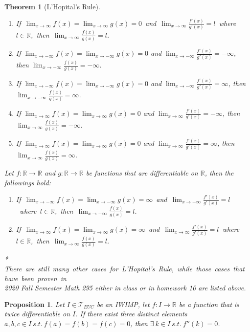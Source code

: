 \documentclass[11pt]{article}
\theoremstyle{break}
\theoremstyle{break}
\newtheorem{thm}{Theorem}[section]
\newtheorem{prop}[lem]{Proposition}
\newcommand{\R}{\mathbb{R}}
\newcommand{\T}{\mathcal{T}}
\begin{document}
\begin{thm}[L'Hopital's Rule]
\begin{enumerate}[topsep=3pt,itemsep=-1ex,partopsep=1ex,parsep=1ex]
			\item \mbox{If $\lim_{x \to \infty}f(x) = \lim_{x \to \infty} g(x) =0$ and $\lim_{x \to \infty} \frac{f'(x)}{g'(x)}=l$ where $l \in \R$, then $\lim_{x \to \infty}\frac{f(x)}{g(x)}=l$}.
			\item If $\lim_{x \to -\infty}f(x) = \lim_{x \to -\infty} g(x) =0$ and $\lim_{x \to -\infty} \frac{f'(x)}{g'(x)}=-\infty$, then $\lim_{x \to -\infty}\frac{f(x)}{g(x)}=-\infty$.
			\item If $\lim_{x \to -\infty}f(x) = \lim_{x \to -\infty} g(x) =0$ and $\lim_{x \to -\infty} \frac{f'(x)}{g'(x)}=\infty$, then $\lim_{x \to -\infty}\frac{f(x)}{g(x)}=\infty$.
			\item If $\lim_{x \to \infty}f(x) = \lim_{x \to \infty} g(x) =0$ and $\lim_{x \to \infty} \frac{f'(x)}{g'(x)}=-\infty$, then $\lim_{x \to \infty}\frac{f(x)}{g(x)}=-\infty$.
			\item If $\lim_{x \to \infty}f(x) = \lim_{x \to \infty} g(x) =0$ and $\lim_{x \to \infty} \frac{f'(x)}{g'(x)}=\infty$, then $\lim_{x \to \infty}\frac{f(x)}{g(x)}=\infty$.
		\end{enumerate}
		\hfill\break
		Let $f:\R \to \R$ and $g:\R \to \R$ be functions that are differentiable on $\R$, then the followings hold:
		\begin{enumerate}[topsep=3pt,itemsep=-1ex,partopsep=1ex,parsep=1ex]
			\item \mbox{If $\lim_{x \to -\infty}f(x) = \lim_{x \to -\infty} g(x) =\infty$ and $\lim_{x \to -\infty} \frac{f'(x)}{g'(x)}=l$ where $l \in \R$, then $\lim_{x \to -\infty}\frac{f(x)}{g(x)}=l$}.
			\item \mbox{If $\lim_{x \to \infty}f(x) = \lim_{x \to \infty} g(x) =\infty$ and $\lim_{x \to \infty} \frac{f'(x)}{g'(x)}=l$ where $l \in \R$, then $\lim_{x \to \infty}\frac{f(x)}{g(x)}=l$}.
		\end{enumerate}
	\hfill\break
	* \mbox{There are still many other cases for L'Hopital's Rule, while those cases that have been proven in}\\ 2020 Fall Semester Math 295 either in class or in homework 10 are listed above.
	\end{thm}

	\begin{prop}
		Let $I \in \T_{EUC}$ be an IWIMP, let $f:I \to \R$ be a function that is twice differentiable on $I$. If there exist three distinct elements $a,b,c \in I \ s.t. \ f(a)=f(b)=f(c)=0$, then $\exists \ k \in I \ s.t. \ f''(k)=0$.
	\end{prop}
			
\end{document}
